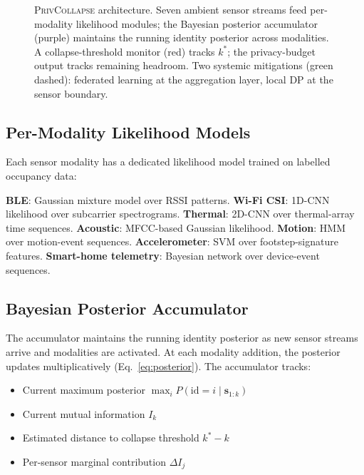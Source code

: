 \documentclass[sigconf,nonacm]{acmart}
\begin{document}
\begin{figure}[t]
\caption{\textsc{PrivCollapse} architecture. Seven ambient sensor
  streams feed per-modality likelihood modules; the Bayesian
  posterior accumulator (purple) maintains the running identity
  posterior across modalities. A collapse-threshold monitor (red)
  tracks $k^*$; the privacy-budget output tracks remaining headroom.
  Two systemic mitigations (green dashed): federated learning
  at the aggregation layer, local DP at the sensor boundary.}
\label{fig:framework}
\end{figure}

\subsection{Per-Modality Likelihood Models}

Each sensor modality has a dedicated likelihood model trained on
labelled occupancy data:

\textbf{BLE}: Gaussian mixture model over RSSI patterns.
\textbf{Wi-Fi CSI}: 1D-CNN likelihood over subcarrier spectrograms.
\textbf{Thermal}: 2D-CNN over thermal-array time sequences.
\textbf{Acoustic}: MFCC-based Gaussian likelihood.
\textbf{Motion}: HMM over motion-event sequences.
\textbf{Accelerometer}: SVM over footstep-signature features.
\textbf{Smart-home telemetry}: Bayesian network over device-event
sequences.

\subsection{Bayesian Posterior Accumulator}

The accumulator maintains the running identity posterior as new
sensor streams arrive and modalities are activated. At each
modality addition, the posterior updates multiplicatively (Eq.\
\ref{eq:posterior}). The accumulator tracks:

\begin{itemize}
  \item Current maximum posterior $\max_i P(\text{id}=i \mid
        \mathbf{s}_{1:k})$
  \item Current mutual information $I_k$
  \item Estimated distance to collapse threshold $k^* - k$
  \item Per-sensor marginal contribution $\Delta I_j$
\end{itemize}
\end{document}
